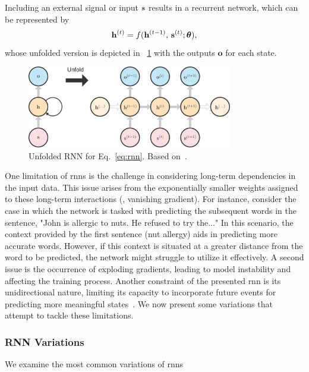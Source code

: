 Including an external signal or input $\mathbf{s}$ results in a recurrent network, which can be represented by
\begin{equation}
    \mathbf{h}^{(t)} = f(\mathbf{h}^{(t-1)}, \, \mathbf{s}^{(t)}; \bm{\theta}),
    \label{eq:rnn}
\end{equation}
 whose unfolded version is depicted in \fig~\ref{fig:unfolded_rnn} with the outputs $\mathbf{o}$ for each state.
 
\begin{figure}[!ht]
\begin{center}
\includegraphics[width=0.80\textwidth]{Figures/Background/unfolded_rnn_full.pdf}
\caption{Unfolded RNN for Eq.~\eqref{eq:rnn}. Based on~\cite{goodfellow2016deep}.}
\label{fig:unfolded_rnn}
\end{center}
\end{figure}

One limitation of \glspl{rnn} is the challenge in considering long-term dependencies in the input data. This issue arises from the exponentially smaller weights assigned to these long-term interactions (\ie, vanishing gradient). For instance, consider the case in which the network is tasked with predicting the subsequent words in the sentence, "John is allergic to nuts. He refused to try the..." In this scenario, the context provided by the first sentence (nut allergy) aids in predicting more accurate words. However, if this context is situated at a greater distance from the word to be predicted, the network might struggle to utilize it effectively. A second issue is the occurrence of exploding gradients, leading to model instability and affecting the training process. Another constraint of the presented \gls{rnn} is its unidirectional nature, limiting its capacity to incorporate future events for predicting more meaningful states~\cite{ibmWhatRecurrent}. We now present some variations that attempt to tackle these limitations.


\subsubsection{RNN Variations}
We examine the most common variations of \glspl{rnn}

